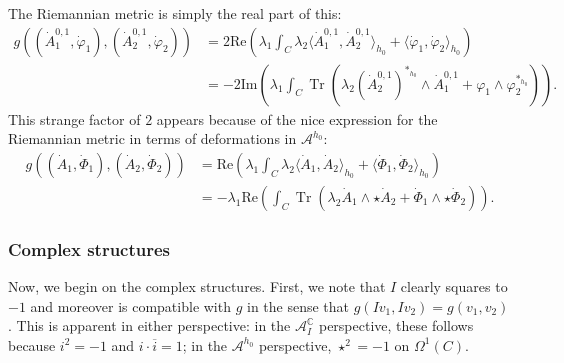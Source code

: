 \documentclass[12pt,letterpaper,reqno]{amsart}
\theoremstyle{remark}
\theoremstyle{definition}
\numberwithin{thm}{section}
\numberwithin{equation}{section}
\numberwithin{figure}{section}
\newcommand{\C}{\ensuremath{\mathbb C}}
\newcommand{\IP}[1]{\langle#1\rangle}
\DeclareMathOperator{\Tr}{Tr}
\begin{document}
The Riemannian metric is simply the real part of this:
\begin{align} \label{eq:metric2}
 g \left((\dot{A}^{0,1}_1, \dot{\varphi}_1), (\dot{A}^{0,1}_2, \dot{\varphi}_2)\right)
&= 2  \mathrm{Re} \left(  \lambda_1 \int_C \lambda_2 \IP{\dot{A}^{0,1}_1, \dot{A}^{0,1}_2}_{h_0} + \IP{\dot\varphi_1, \dot\varphi_2}_{h_0} \right) \nonumber \\
&=-2 \mathrm{Im}  \left( \lambda_1 \int_C \Tr  \left( \lambda_2 (\dot{A}^{0,1}_{2} )^{*_{h_0}} \wedge \dot{A}^{0,1}_{1}   + \varphi_{1} \wedge \varphi_{2}^{*_{h_0}}  \right) \right).
\end{align}
This strange factor of $2$ appears because of the nice expression for the Riemannian metric in terms of deformations in $\mathcal{A}^{h_0}$:
\begin{align}\label{eq:metric3}
 g \left((\dot{A}_1, \dot \Phi_1), (\dot{A}_2, \dot{\Phi}_2)\right)
&=  \mathrm{Re}\left( \lambda_1 \int_C \lambda_2 \IP{\dot{A}_1, \dot{A}_2}_{h_0} + \IP{\dot\Phi_1, \dot\Phi_2}_{h_0} \right) \nonumber \\
&=  - \lambda_1 \mathrm{Re} \left(\int_C \Tr \left( \lambda_2 \dot{A}_1 \wedge \star \dot{A}_2 + \dot \Phi_1 \wedge \star  \dot\Phi_2 \right) \right).
\end{align}
\subsubsection{Complex structures}

Now, we begin on the complex structures. First, we note that $I$ clearly squares to $-1$ and moreover is compatible with $g$ in the sense that $g(I v_1, I v_2)=g(v_1,v_2)$.
This is apparent in either perspective: in the $\mathcal{A}_I^{\C}$ perspective, these follows because $i^2=-1$ and $i \cdot  \overline{i}=1$; in the $\mathcal{A}^{h_0}$ perspective, $\star^2 =-1$ on $\Omega^1(C)$. 
\end{document}
